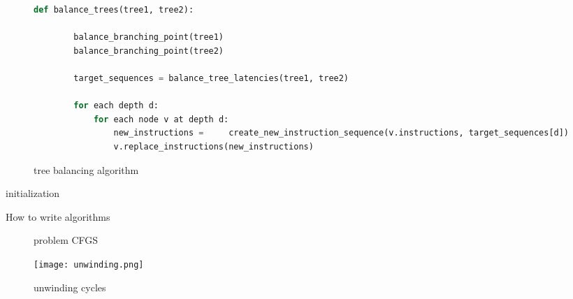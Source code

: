 \documentclass{article}
\begin{document}

\begin{figure}
	\begin{lstlisting}[language=Python]
	def balance_trees(tree1, tree2):
	
		balance_branching_point(tree1)
		balance_branching_point(tree2)
	
		target_sequences = balance_tree_latencies(tree1, tree2)

		for each depth d: 
			for each node v at depth d:
				new_instructions =     create_new_instruction_sequence(v.instructions, target_sequences[d])
    			v.replace_instructions(new_instructions)
\end{lstlisting}
\caption{tree balancing algorithm}
\label{tree_balancing}
\end{figure}

\begin{algorithm}[H]
\SetAlgoLined
{}
 initialization\;
 \caption{How to write algorithms}
\end{algorithm}

\begin{figure}
\begin{center}

\end{center}

\caption{problem CFGS}
\label{problem_cfg}
\end{figure}



\begin{figure}
\begin{center}
\texttt{[image: unwinding.png]}
\end{center}
\caption{unwinding cycles}
\label{unwinding_cycles}
\end{figure}
\end{document}
